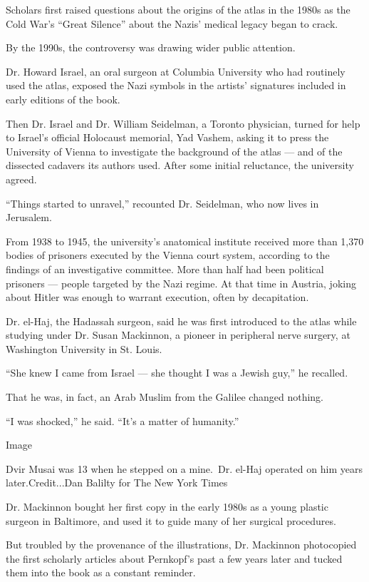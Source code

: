Scholars first raised questions about the origins of the atlas in the
1980s as the Cold War's ``Great Silence'' about the Nazis' medical
legacy began to crack.

By the 1990s, the controversy was drawing wider public attention.

Dr. Howard Israel, an oral surgeon at Columbia University who had
routinely used the atlas, exposed the Nazi symbols in the artists'
signatures included in early editions of the book.

Then Dr. Israel and Dr. William Seidelman, a Toronto physician, turned
for help to Israel's official Holocaust memorial, Yad Vashem, asking it
to press the University of Vienna to investigate the background of the
atlas --- and of the dissected cadavers its authors used. After some
initial reluctance, the university agreed.

``Things started to unravel,'' recounted Dr. Seidelman, who now lives in
Jerusalem.

From 1938 to 1945, the university's anatomical institute received more
than 1,370 bodies of prisoners executed by the Vienna court system,
according to the findings of an investigative committee. More than half
had been political prisoners --- people targeted by the Nazi regime. At
that time in Austria, joking about Hitler was enough to warrant
execution, often by decapitation.

Dr. el-Haj, the Hadassah surgeon, said he was first introduced to the
atlas while studying under Dr. Susan Mackinnon, a pioneer in peripheral
nerve surgery, at Washington University in St. Louis.

``She knew I came from Israel --- she thought I was a Jewish guy,'' he
recalled.

That he was, in fact, an Arab Muslim from the Galilee changed nothing.

``I was shocked,'' he said. ``It's a matter of humanity.''

Image

Dvir Musai was 13 when he stepped on a mine.~Dr. el-Haj operated on him
years later.Credit...Dan Balilty for The New York Times

Dr. Mackinnon bought her first copy in the early 1980s as a young
plastic surgeon in Baltimore, and used it to guide many of her surgical
procedures.

But troubled by the provenance of the illustrations, Dr. Mackinnon
photocopied the first scholarly articles about Pernkopf's past a few
years later and tucked them into the book as a constant reminder.

